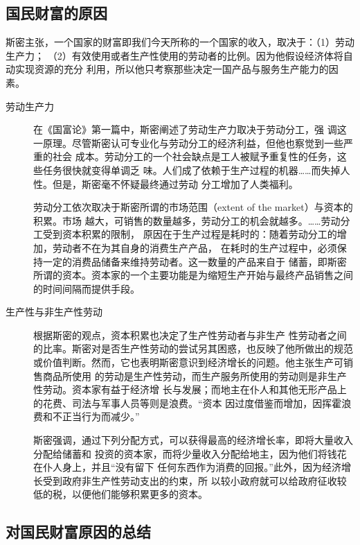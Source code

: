 \subsection{国民财富的原因}

斯密主张，一个国家的财富即我们今天所称的一个国家的收入，取决于：（1）劳动生产力；
（2）有效使用或者生产性使用的劳动者的比例。因为他假设经济体将自动实现资源的充分
利用，所以他只考察那些决定一国产品与服务生产能力的因素。

\begin{description}
\item [劳动生产力] 在《国富论》第一篇中，斯密阐述了劳动生产力取决于劳动分工，强
  调这一原理。尽管斯密认可专业化与劳动分工的经济利益，但他也察觉到一些严重的社会
  成本。劳动分工的一个社会缺点是工人被赋予重复性的任务，这些任务很快就变得单调乏
  味。人们成了依赖于生产过程的机器……而失掉人性。但是，斯密毫不怀疑最终通过劳动
  分工增加了人类福利。

  劳动分工依次取决于斯密所谓的市场范围（extent of the market）与资本的积累。市场
  越大，可销售的数量越多，劳动分工的机会就越多。……劳动分工受到资本积累的限制，
  原因在于生产过程是耗时的：随着劳动分工的增加，劳动者不在为其自身的消费生产产品，
  在耗时的生产过程中，必须保持一定的消费品储备来维持劳动者。这一数量的产品来自于
  储蓄，即斯密所谓的资本。资本家的一个主要功能是为缩短生产开始与最终产品销售之间
  的时间间隔而提供手段。


\item[生产性与非生产性劳动] 根据斯密的观点，资本积累也决定了生产性劳动者与非生产
  性劳动者之间的比率。斯密对是否生产性劳动的尝试另其困惑，也反映了他所做出的规范
  或价值判断。然而，它也表明斯密意识到经济增长的问题。他主张生产可销售商品所使用
  的劳动是生产性劳动，而生产服务所使用的劳动则是非生产性劳动。资本家有益于经济增
  长与发展；而地主在仆人和其他无形产品上的花费、司法与军事人员等则是浪费。“资本
  因过度借鉴而增加，因挥霍浪费和不正当行为而减少。”

  斯密强调，通过下列分配方式，可以获得最高的经济增长率，即将大量收入分配给储蓄和
  投资的资本家，而将少量收入分配给地主，因为他们将钱花在仆人身上，并且“没有留下
  任何东西作为消费的回报。”此外，因为经济增长受到政府非生产性劳动支出的约束，所
  以较小政府就可以给政府征收较低的税，以便他们能够积累更多的资本。
\end{description}

\subsection{对国民财富原因的总结}


